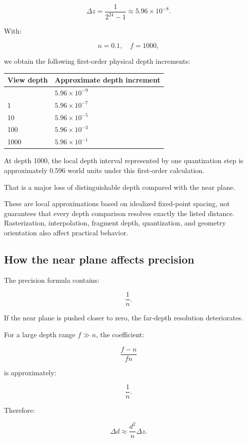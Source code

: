 \[
 \Delta z= \frac1{2^{24}-1} \approx5.96\times10^{-8}.
\]

With:

\[
 n=0.1,\quad f=1000,
\]

we obtain the following first-order physical depth increments:

{\def\LTcaptype{none} %
\begin{longtable}[]{@{}ll@{}}
\toprule\noalign{}
View depth & Approximate depth increment \\
\midrule\noalign{}
\endhead
\bottomrule\noalign{}
\endlastfoot
0.1 & \(5.96\times10^{-9}\) \\
1 & \(5.96\times10^{-7}\) \\
10 & \(5.96\times10^{-5}\) \\
100 & \(5.96\times10^{-3}\) \\
1000 & \(5.96\times10^{-1}\) \\
\end{longtable}
}

At depth 1000, the local depth interval represented by one quantization step is approximately 0.596 world units under this first-order calculation.

That is a major loss of distinguishable depth compared with the near plane.

These are local approximations based on idealized fixed-point spacing, not guarantees that every depth comparison resolves exactly the listed distance. Rasterization, interpolation, fragment depth, quantization, and geometry orientation also affect practical behavior.

\subsection{How the near plane affects precision}\label{02-foundations-ii-ch033-how-the-near-plane-affects-precision}

The precision formula contains:

\[
 \frac1n.
\]

If the near plane is pushed closer to zero, the far-depth resolution deteriorates.

For a large depth range \(f\gg n\), the coefficient:

\[
 \frac{f-n}{fn}
\]

is approximately:

\[
 \frac1n.
\]

Therefore:

\[
 \boxed{ \Delta d\approx\frac{d^2}{n}\Delta z }.
\]

